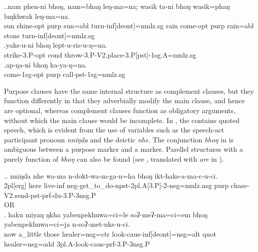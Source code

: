 \ex.\ag.nam phen-ni     bhoŋ, nam=bhaŋ   leŋ-ma=na; wasik ta-ni      bhoŋ wasik=phaŋ   luŋkhwak leŋ-ma=na.\\
sun shine{\sc [3sg;sbjv]-opt} {\sc purp}   sun{\sc =abl}   turn{\sc -inf[deont]=nmlz.sg}  rain come{\sc [3sg;sbjv]-opt} {\sc purp} rain{\sc =abl} stone turn{\sc -inf[deont]=nmlz.sg}\\
 
\bg.yaks-u-ni bhoŋ lept-u-ris-u-ŋ=na.\\
strike{\sc -3.P-opt} {\sc cond}  throw{\sc -3.P-V2.place-3.P[pst]-1sg.A=nmlz.sg}\\
\bg.ap-ŋa-ni bhoŋ ka-ya-ŋ=na.\\
come{\sc -1sg-opt} {\sc purp} call{\sc -pst-1sg=nmlz.sg}\\

Purpose clauses have the same internal structure as complement clauses, but they function differently in that they adverbially modify the main clause, and hence are optional, whereas complement clauses function as obligatory arguments, without which the main clause would be incomplete.
 In \Next[a], the  contains quoted speech, which is evident from the use of variables such as the speech-act participant pronoun \emph{nniŋda} and the deictic  \emph{nhe}. The conjunction \emph{bhoŋ} in \Next[a] is ambiguous between a purpose marker and a  marker. Parellel  structures with a purely  function of \emph{bhoŋ} can also be found (see \Next[b], translated with \emph{are} in ). 

\ex.\ag. nniŋda nhe  wa-ma      n-dokt-wa-m-ga-n=ha  bhoŋ ikt-haks-a-ma-c-u-ci.\\
	{\sc 2pl[erg]} here live{\sc -inf} {\sc neg-}get\_to\_do{\sc -npst-2pl.A[3.P]-2-neg=nmlz.nsg} {\sc purp} chase-{\sc V2.send-pst-prf-du-3.P-3nsg.P}	\\
	 OR \\
	 
	\bg. haku miyaŋ ŋkha yabenpekhuwa=ci=le soʔ-meʔ-ma=ci=em bhoŋ yabenpekhuwa=ci=ja    n-soʔ-met-uks-u-ci.\\
	now a\_little those healer{\sc =nsg=ctr} look{\sc -caus-inf[deont]=nsg=alt} {\sc quot} healer{\sc =nsg=add} {\sc 3pl.A-}look{\sc -caus-prf-3.P-3nsg.P}\\
	 


